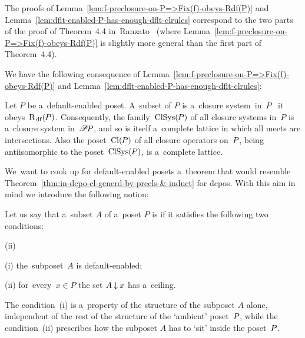 \documentclass[11pt,letterpaper]{article}
\renewcommand{\thmskip}{\bigskip}
\begin{document}
\thmskip

The proofs of Lemma~\ref{lem:f-preclosure-on-P=>Fix(f)-obeys-Rdf(P)}
	and Lemma~\ref{lem:dflt-enabled-P-has-enough-dflt-clrules}
correspond to the two parts of the proof of Theorem~4.4 in~Ranzato~\cite{ranzato}
(where Lemma~\ref{lem:f-preclosure-on-P=>Fix(f)-obeys-Rdf(P)}
	is slightly more general than the first part of Theorem~4.4).

\thmskip

We have the following consequence of
	Lemma~\ref{lem:f-preclosure-on-P=>Fix(f)-obeys-Rdf(P)}
		and Lemma~\ref{lem:dflt-enabled-P-has-enough-dflt-clrules}:

\thmskip

\begin{proposition}\label{prop:P-dflt-enabled=>ClSys(P)-clsys-in-Pow(P)-etc}
Let\/ $P$ be a~default-enabled poset.
A~subset of\/ $P$ is a~closure system~in\/~$P$ \iff\ it obeys\/~$\mathrm{R}_{\mspace{2mu}\mathrm{df}}(\mspace{-1mu} P)$.
Consequently, the family\/~$\mathop{\smash{\mathrm{ClSys}}}\nolimits(\mspace{-1mu} P)$ of all closure systems in\/~$P$
is a~closure system in\/~$\mathscr{P}\mspace{-2mu} P\mspace{-1mu}$,
and so is itself a~complete lattice in which all meets are intersections.
Also the poset\/~$\mathop{\smash{\mathrm{Cl}}}\nolimits(\mspace{-1mu} P)$ of all closure operators on\/~$P\mspace{-1mu}$,
being antiisomorphic to the poset\/~$\mathop{\smash{\mathrm{ClSys}}}\nolimits(\mspace{-1mu} P)$,
	is a~complete lattice.
\end{proposition}

\thmskip

We~want to cook up for default-enabled posets a~theorem
	that would resemble Theorem~\ref{thm:in-dcpo-cl-generd-by-precls-&-induct} for dcpos.
With this aim in mind we introduce the following notion:

\txtskip

Let us say that a~subset $A$ of a~poset $P$ is 
if it satisfies the following two conditions:
%
\begin{items}{{\rm(ii)}\:}
\item[{\rm(i)}\:] the~subposet~$A$ is default-enabled;
\item[{\rm(ii)}\:] for~every~$x\in P$ the set $A\mathbin{\downarrow} x$ has a~ceiling.
\end{items}%
%
\pagebreak[3]
\noindent The condition~(i) is a~property of the structure of the subposet $A$ alone,
	independent of the rest of the structure of the `ambient' poset~$P\mspace{-1mu}$,
while the condition~(ii) prescribes how the subposet $A$ has to `sit' inside the poset~$P\mspace{-1mu}$.
\end{document}
